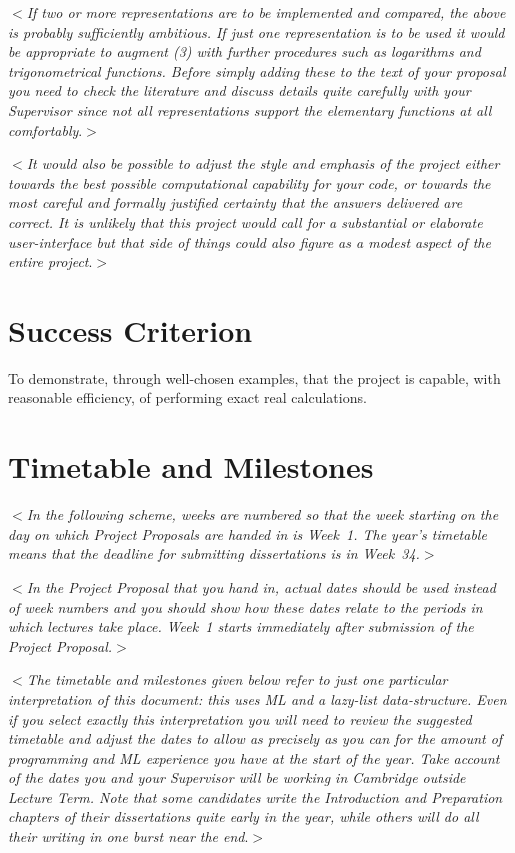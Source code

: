 \documentclass[12pt]{article}
\newcommand{\al}{$<$}
\newcommand{\ar}{$>$}
\begin{document}
\al\emph{If two or more representations are to be implemented and
  compared, the above is probably sufficiently ambitious.  If just one
  representation is to be used it would be appropriate to augment (3)
  with further procedures such as logarithms and trigonometrical
  functions.  Before simply adding these to the text of your proposal
  you need to check the literature and discuss details quite carefully
  with your Supervisor since not all representations support the
  elementary functions at all comfortably}.\ar

\al\emph{It would also be possible to adjust the style and emphasis of
  the project either towards the best possible computational
  capability for your code, or towards the most careful and formally
  justified certainty that the answers delivered are correct.  It is
  unlikely that this project would call for a substantial or elaborate
  user-interface but that side of things could also figure as a modest
  aspect of the entire project}.\ar


\section*{Success Criterion}

To demonstrate, through well-chosen examples, that the project is
capable, with reasonable efficiency, of performing exact real
calculations.


\section*{Timetable and Milestones}

\al\emph{In the following scheme, weeks are numbered so that the week
  starting on the day on which Project Proposals are handed in is
  Week~1.  The year's timetable means that the deadline for submitting
  dissertations is in Week~34.}\ar

\al\emph{In the Project Proposal that you hand in, {\rm actual dates}
  should be used instead of week numbers and you should show how these
  dates relate to the periods in which lectures take place. Week~1
  starts immediately after submission of the Project Proposal.}\ar

\al\emph{The timetable and milestones given below refer to just one
  particular interpretation of this document: this uses ML and a
  lazy-list data-structure.  Even if you select exactly this
  interpretation you will need to review the suggested timetable and
  adjust the dates to allow as precisely as you can for the amount of
  programming and ML experience you have at the start of the year.
  Take account of the dates you and your Supervisor will be working in
  Cambridge outside Lecture Term.  Note that some candidates write the
  Introduction and Preparation chapters of their dissertations quite
  early in the year, while others will do all their writing in one
  burst near the end}.\ar
\end{document}
